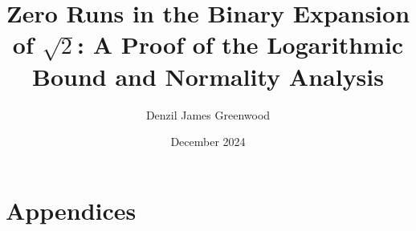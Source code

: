 
\title{\centering Zero Runs in the Binary Expansion of $\sqrt{2}$: A Proof of the Logarithmic Bound and Normality Analysis}
\author{Denzil James Greenwood}
\date{December 2024}



\maketitle


\newpage
\tableofcontents
\newpage










\newpage
{}




\cite{dirichlet}
\cite{normalnumber}
\cite{roth1955}
\cite{transcendental}
\cite{dataaspirant_ks_test}
\cite{evertse_diophantine_notes}
\cite{mit_ks_test}
\cite{wikipedia_ks_test}


\newpage
{}
{}
\section*{\Large\textbf{Appendices}}
\label{sec:python_code, Zero Run Analysis Algorithm}


\newpage
{}
\label{sec:python_code, Zero Run Normality Analysis Algorithm}



